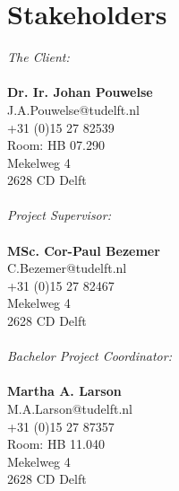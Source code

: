 \section{Stakeholders}
\textit{The Client:}\\
\\
\textbf{Dr. Ir. Johan Pouwelse}\\
J.A.Pouwelse@tudelft.nl\\
+31 (0)15 27 82539\\
Room: HB 07.290\\
Mekelweg 4\\
2628 CD Delft\\
\\
\textit{Project Supervisor:}\\
\\
\textbf{MSc. Cor-Paul Bezemer}\\
C.Bezemer@tudelft.nl\\ 
+31 (0)15 27 82467\\
Mekelweg 4\\
2628 CD Delft\\
\\
\textit{Bachelor Project Coordinator:}\\
\\
\textbf{Martha A. Larson}\\
M.A.Larson@tudelft.nl\\
+31 (0)15 27 87357\\
Room: HB 11.040\\
Mekelweg 4\\
2628 CD Delft\\
